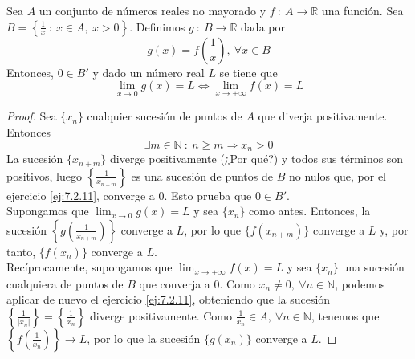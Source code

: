 \begin{prop}\label{prop:13.4.3}
    Sea $A$ un conjunto de números reales no mayorado y $f ~:~ A \longrightarrow \mathbb{R}$ una función.
    Sea $B = \left\{ \frac{1}{x} ~:~ x \in A, ~ x > 0 \right\}$. Definimos $g ~:~ B \longrightarrow \mathbb{R}$ dada por
    \begin{equation*}
        g(x) = f\left(\frac{1}{x}\right), ~ \forall x \in B
    \end{equation*}
    Entonces, $0 \in B'$ y dado un número real $L$ se tiene que
    \begin{equation*}
        \displaystyle\lim_{x \to 0} g(x) = L \Longleftrightarrow \displaystyle\lim_{x \to + \infty} f(x) = L
    \end{equation*}
\end{prop}
\begin{proof}
    Sea $\{x_n\}$ cualquier sucesión de puntos de $A$ que diverja positivamente. Entonces
    \begin{equation*}
        \exists m \in \mathbb{N} ~:~ n \geq m \Longrightarrow x_n > 0
    \end{equation*}
    La sucesión $\{x_{n+m}\}$ diverge positivamente (¿Por qué?) y todos sus términos son positivos, luego $\left\{ \frac{1}{x_{n+m}} \right\}$ es una sucesión de puntos de $B$ no nulos que,
    por el ejercicio \ref{ej:7.2.11}, converge a $0$. Esto prueba que $0 \in B'$.\\
    
    Supongamos que $\displaystyle\lim_{x \to 0} g(x) = L$ y sea $\{x_n\}$ como antes. Entonces, la sucesión $\left\{g\left(\frac{1}{x_{n+m}}\right)\right\}$ converge a $L$, por lo que $\{f(x_{n+m})\}$ converge a $L$ y, por tanto, $\{f(x_n)\}$ converge a $L$.\\
    
    Recíprocamente, supongamos que $\displaystyle\lim_{x \to + \infty} f(x) = L$ y sea $\{x_n\}$ una sucesión cualquiera de puntos de $B$ que converja a $0$. Como $x_n \neq 0, ~ \forall n \in \mathbb{N}$, podemos aplicar de nuevo el ejercicio \ref{ej:7.2.11}, obteniendo que la sucesión $\left\{\frac{1}{|x_n|}\right\} = \left\{\frac{1}{x_n}\right\}$ diverge positivamente. Como $\frac{1}{x_n} \in A, ~ \forall n \in \mathbb{N}$, tenemos que $\left\{f\left(\frac{1}{x_n}\right)\right\} \longrightarrow L$, por lo que la sucesión $\{g(x_n)\}$ converge a $L$.
\end{proof}


